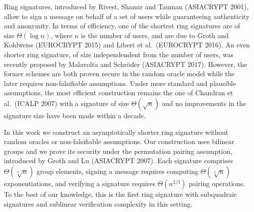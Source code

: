 
Ring signatures, introduced by Rivest, Shamir and Tauman (ASIACRYPT 2001), allow to sign a message on behalf of a set of users while guaranteeing authenticity and anonymity. In terms of efficiency, one of the shortest ring signatures are of size $\Theta(\log n)$, where $n$ is the number of users, and are due to Groth and Kohlweiss (EUROCRYPT 2015) and Libert et al.~(EUROCRYPT 2016). An even shorter ring signature, of size independendent from the number of users, was recently proposed by Malavolta and  Schr\"oder (ASIACRYPT 2017).
However, the former schemes are both proven secure in the random oracle model while the later requires non-falsifiable assumptions. Under more standard and plausible assumptions, the most efficient construction remains the one of Chandran et al.~(ICALP 2007) with a signature of size $\Theta(\sqrt{n})$ and no improvements in the signature size have been made within a decade.

In this work we construct an asymptotically shorter ring signature without random oracles or non-falsifiable assumptions. Our construction uses bilinear groups and we prove its security under the permutation pairing assumption, introduced by Groth and Lu (ASIACRYPT 2007).
 Each signature comprises $\Theta(\sqrt[3]{n})$ group elements, signing a message requires computing $\Theta(\sqrt[3]{n})$ exponentiations, and verifying a signature requires $\Theta(n^{2/3})$ pairing operations. To the best of our knowledge, this is the first ring signature with subquadraic signatures and sublinear verification complexity in this setting.
